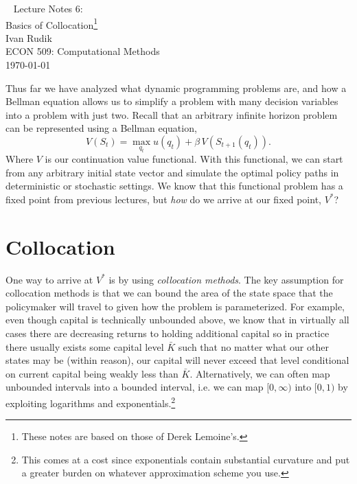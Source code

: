 \documentclass[11pt]{article}%
\begin{document}
\begin{center}
\renewcommand{\thefootnote}{\fnsymbol{footnote}}
\noindent\huge 
~
Lecture Notes 6:\\Basics of Collocation\footnote{These notes are based on those of Derek Lemoine's.}\\
\vspace{.3cm}
\vspace{.4cm} 
{\Large Ivan Rudik} \\
\vspace{.7cm} 
{\Large
ECON 509: Computational Methods\\
\today
}
\end{center}
\vspace{.5in}
\onehalfspacing
\setcounter{footnote}{0}
Thus far we have analyzed what dynamic programming problems are, and how a Bellman equation allows us to simplify a problem with many decision variables into a problem with just two. Recall that an arbitrary infinite horizon problem can be represented using a Bellman equation,$$
V(S_t) = \max_{q_t} u(q_t) + \beta\,V(S_{t+1}(q_t)).$$
Where $V$ is our continuation value functional. With this functional, we can start from any arbitrary initial state vector and simulate the optimal policy paths in deterministic or stochastic settings. We know that this functional problem has a fixed point from previous lectures, but \emph{how} do we arrive at our fixed point, $V^*$?

\section{Collocation}
One way to arrive at $V^*$ is by using \emph{collocation methods}. The key assumption for collocation methods is that we can bound the area of the state space that the policymaker will travel to given how the problem is parameterized. For example, even though capital is technically unbounded above, we know that in virtually all cases there are decreasing returns to holding additional capital so in practice there usually exists some capital level $\bar{K}$ such that no matter what our other states may be (within reason), our capital will never exceed that level conditional on current capital being weakly less than $\bar{K}$. Alternatively, we can often map unbounded intervals into a bounded interval, i.e. we can map $[0,\infty)$ into $[0,1)$ by exploiting logarithms and exponentials.\footnote{This comes at a cost since exponentials contain substantial curvature and put a greater burden on whatever approximation scheme you use.} 
\end{document}
